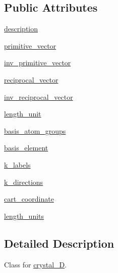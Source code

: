 \subsection*{Public Attributes}
\begin{DoxyCompactItemize}
\item 
\hyperlink{class_d_f_t___k_i_t_1_1core_1_1crystal__3_d_1_1crystal__3_d_a0239fc0cee6cd4e79ce9d7175ceb585d}{description}
\item 
\hyperlink{class_d_f_t___k_i_t_1_1core_1_1crystal__3_d_1_1crystal__3_d_a8be1646b7a612989dc73502430a450c2}{primitive\+\_\+vector}
\item 
\hyperlink{class_d_f_t___k_i_t_1_1core_1_1crystal__3_d_1_1crystal__3_d_a8da908b53e91c839cab9e0efe07cc3fd}{inv\+\_\+primitive\+\_\+vector}
\item 
\hyperlink{class_d_f_t___k_i_t_1_1core_1_1crystal__3_d_1_1crystal__3_d_ac792f9a47ced7b38b07d17d55e043d3b}{reciprocal\+\_\+vector}
\item 
\hyperlink{class_d_f_t___k_i_t_1_1core_1_1crystal__3_d_1_1crystal__3_d_a7d30d0f0c094774e655b37eb1e957a03}{inv\+\_\+reciprocal\+\_\+vector}
\item 
\hyperlink{class_d_f_t___k_i_t_1_1core_1_1crystal__3_d_1_1crystal__3_d_a5e317e2491734325c03e50c6f3823d45}{length\+\_\+unit}
\item 
\hyperlink{class_d_f_t___k_i_t_1_1core_1_1crystal__3_d_1_1crystal__3_d_ab74777e35fe1ceb493515252c4e11b07}{basis\+\_\+atom\+\_\+groups}
\item 
\hyperlink{class_d_f_t___k_i_t_1_1core_1_1crystal__3_d_1_1crystal__3_d_af70e4b25b18a6ec1868c2e6e445dbb13}{basis\+\_\+element}
\item 
\hyperlink{class_d_f_t___k_i_t_1_1core_1_1crystal__3_d_1_1crystal__3_d_acdab713c57aa03bb2b557943925ee427}{k\+\_\+labels}
\item 
\hyperlink{class_d_f_t___k_i_t_1_1core_1_1crystal__3_d_1_1crystal__3_d_a03d6814d7345e080c021bbadc0b60ba7}{k\+\_\+directions}
\item 
\hyperlink{class_d_f_t___k_i_t_1_1core_1_1crystal__3_d_1_1crystal__3_d_acb068ebdcded14e39fba88ab7699fe4a}{cart\+\_\+coordinate}
\item 
\hyperlink{class_d_f_t___k_i_t_1_1core_1_1crystal__3_d_1_1crystal__3_d_a33bce31d085891baa0a4b7836d255980}{length\+\_\+units}
\end{DoxyCompactItemize}


\subsection{Detailed Description}
Class for \hyperlink{class_d_f_t___k_i_t_1_1core_1_1crystal__3_d_1_1crystal__3_d}{crystal\+\_\+D}. 


